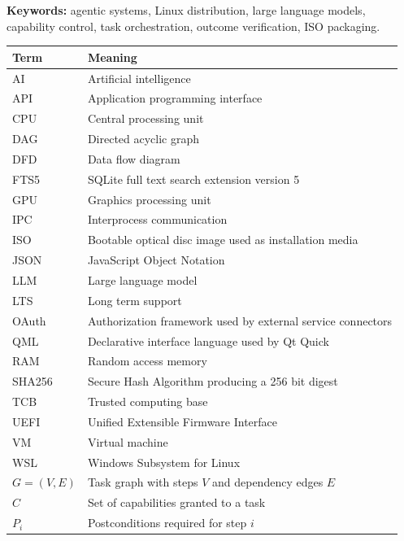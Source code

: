 \noindent\textbf{Keywords:} agentic systems, Linux distribution, large language models, capability control, task orchestration, outcome verification, ISO packaging.
\clearpage
{}
\begin{longtable}{P{25mm}P{115mm}}
\toprule\textbf{Term} & \textbf{Meaning}\\\midrule\endhead
AI & Artificial intelligence\\API & Application programming interface\\CPU & Central processing unit\\DAG & Directed acyclic graph\\DFD & Data flow diagram\\FTS5 & SQLite full text search extension version 5\\GPU & Graphics processing unit\\IPC & Interprocess communication\\ISO & Bootable optical disc image used as installation media\\JSON & JavaScript Object Notation\\LLM & Large language model\\LTS & Long term support\\OAuth & Authorization framework used by external service connectors\\QML & Declarative interface language used by Qt Quick\\RAM & Random access memory\\SHA256 & Secure Hash Algorithm producing a 256 bit digest\\TCB & Trusted computing base\\UEFI & Unified Extensible Firmware Interface\\VM & Virtual machine\\WSL & Windows Subsystem for Linux\\$G=(V,E)$ & Task graph with steps $V$ and dependency edges $E$\\$C$ & Set of capabilities granted to a task\\$P_i$ & Postconditions required for step $i$\\\bottomrule
\end{longtable}
